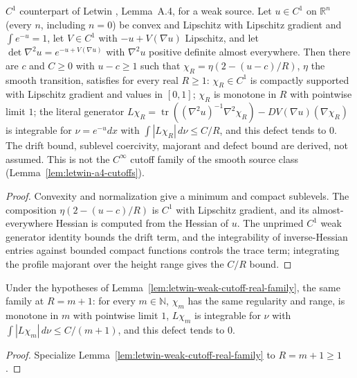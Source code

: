 \begin{lemma}
  \label{lem:letwin-weak-cutoff-real-family}
  \leanok
  $C^1$ counterpart of Letwin \cite{Letwin2026QuadraticKLS}, Lemma~A.4, for a weak source. Let $u\in C^1$ on $\mathbb R^n$ (every $n$,
  including $n=0$) be convex and Lipschitz with Lipschitz gradient and $\int e^{-u}=1$, let $V\in C^1$ with $-u+V(\nabla u)$ Lipschitz,
  and let $\det\nabla^2u=e^{-u+V(\nabla u)}$ with $\nabla^2u$ positive definite almost everywhere. Then there are $c$ and $C\ge0$ with
  $u-c\ge1$ such that $\chi_R=\eta(2-(u-c)/R)$, $\eta$ the smooth transition, satisfies for every real $R\ge1$: $\chi_R\in C^1$ is
  compactly supported with Lipschitz gradient and values in $[0,1]$; $\chi_R$ is monotone in $R$ with pointwise limit $1$; the literal
  generator $L\chi_R=\operatorname{tr}((\nabla^2u)^{-1}\nabla^2\chi_R)-DV(\nabla u)(\nabla\chi_R)$ is integrable for $\nu=e^{-u}dx$ with
  $\int|L\chi_R|\,d\nu\le C/R$, and this defect tends to $0$. The drift bound, sublevel coercivity, majorant and defect bound are
  derived, not assumed. This is not the $C^\infty$ cutoff family of the smooth source class (Lemma~\ref{lem:letwin-a4-cutoffs}).
\end{lemma}
\begin{proof}
  \leanok
  Convexity and normalization give a minimum and compact sublevels. The composition $\eta(2-(u-c)/R)$ is $C^1$ with Lipschitz gradient,
  and its almost-everywhere Hessian is computed from the Hessian of $u$. The unprimed $C^1$ weak generator identity bounds the
  drift term, and the integrability of inverse-Hessian entries against bounded compact functions controls the trace term; integrating
  the profile majorant over the height range gives the $C/R$ bound.
\end{proof}

\begin{lemma}
  \label{lem:letwin-weak-cutoff-natural-family}
  \leanok
  Under the hypotheses of Lemma~\ref{lem:letwin-weak-cutoff-real-family}, the same family at $R=m+1$: for every $m\in\mathbb N$,
  $\chi_m$ has the same regularity and range, is monotone in $m$ with pointwise limit $1$, $L\chi_m$ is integrable for $\nu$ with
  $\int|L\chi_m|\,d\nu\le C/(m+1)$, and this defect tends to $0$.
\end{lemma}
\begin{proof}
  \leanok
  Specialize Lemma~\ref{lem:letwin-weak-cutoff-real-family} to $R=m+1\ge1$.
\end{proof}

